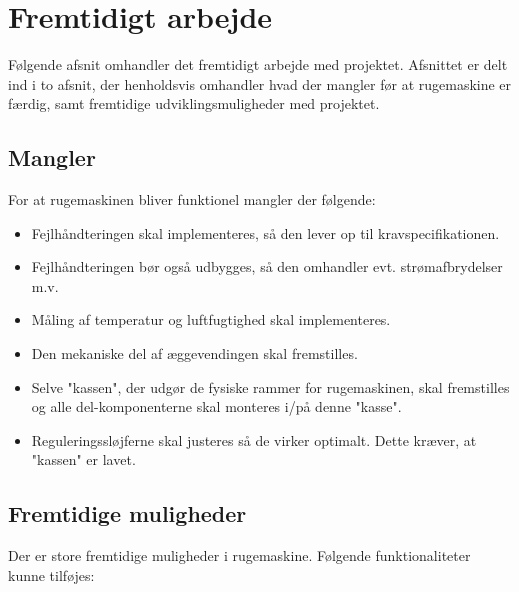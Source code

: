 \newpage
\section{Fremtidigt arbejde}
Følgende afsnit omhandler det fremtidigt arbejde med projektet. Afsnittet er delt ind i to afsnit, der henholdsvis omhandler hvad der mangler før at rugemaskine er færdig, samt fremtidige udviklingsmuligheder med projektet.

\subsection{Mangler}
For at rugemaskinen bliver funktionel mangler der følgende:
\begin{itemize}
	\item Fejlhåndteringen skal implementeres, så den lever op til kravspecifikationen.
	\item Fejlhåndteringen bør også udbygges, så den omhandler evt. strømafbrydelser m.v.
	\item Måling af temperatur og luftfugtighed skal implementeres.
 	\item Den mekaniske del af æggevendingen skal fremstilles.
  	\item Selve "kassen", der udgør de fysiske rammer for rugemaskinen, skal fremstilles og alle del-komponenterne skal monteres i/på denne "kasse".
 	\item Reguleringssløjferne skal justeres så de virker optimalt. Dette kræver, at "kassen" er lavet.
\end{itemize}

\subsection{Fremtidige muligheder}

Der er store fremtidige muligheder i rugemaskine. Følgende funktionaliteter kunne tilføjes:  

